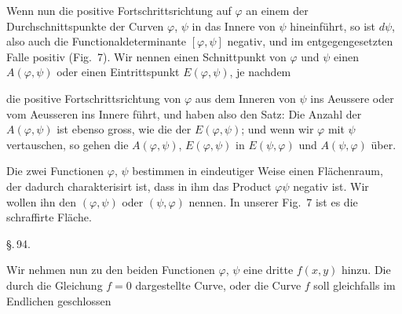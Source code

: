 Wenn nun die positive Fortschrittsrichtung auf $\varphi$ an einem
der Durchschnittspunkte der Curven $\varphi$, $\psi$ in das Innere von $\psi$
hineinführt, so ist $d\psi$, also auch die Functionaldeterminante
$[\varphi, \psi]$ negativ, und im entgegengesetzten Falle positiv (Fig.~7).
Wir nennen einen Schnittpunkt von $\varphi$ und $\psi$ einen
 $A(\varphi, \psi)$ oder einen Eintrittspunkt
$E(\varphi,\psi)$, je nachdem


die positive Fortschrittsrichtung von $\varphi$ aus dem Inneren von $\psi$
ins Aeussere oder vom Aeusseren ins Innere führt, und haben also den Satz:
Die Anzahl der $A(\varphi, \psi)$ ist ebenso gross, wie die der $E(\varphi, \psi)$;
und wenn wir $\varphi$ mit $\psi$ vertauschen, so gehen die $A(\varphi, \psi)$, $E(\varphi, \psi)$
in $E(\psi, \varphi)$ und $A(\psi, \varphi)$ über.

Die zwei Functionen $\varphi$, $\psi$ bestimmen in eindeutiger Weise
einen Flächenraum, der dadurch charakterisirt ist, dass in ihm
das Product $\varphi\psi$ negativ ist. Wir wollen ihn den 
$(\varphi, \psi)$ oder $(\psi, \varphi)$ nennen. In unserer Fig.~7 ist es die schraffirte
Fläche.

\begin{center}
\S.\,94.

\end{center}

Wir nehmen nun zu den beiden Functionen $\varphi$, $\psi$ eine dritte
$f(x, y)$ hinzu. Die durch die Gleichung $f = 0$ dargestellte
Curve, oder die Curve $f$ soll gleichfalls im Endlichen geschlossen
